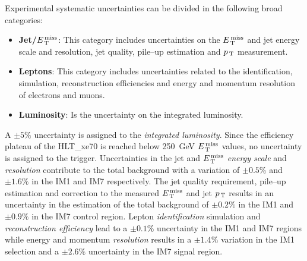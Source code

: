 Experimental systematic uncertainties can be divided in the following broad
categories:
\begin{itemize}
\item \textbf{Jet/$E_\mathrm{\, T}^\mathrm{\, miss}$}: This category includes uncertainties on the $E_\mathrm{\, T}^\mathrm{\, miss}$
  and jet energy scale and resolution, jet quality, pile--up estimation and
  $p_\mathrm{\, T}$ measurement.
\item \textbf{Leptons}: This category includes uncertainties related to the
  identification, simulation, reconstruction efficiencies and energy and
  momentum resolution of electrons and muons.
\item \textbf{Luminosity}: Is the uncertainty on the integrated luminosity.
\end{itemize}
A $\pm 5\%$ uncertainty is assigned to the \emph{integrated luminosity}. Since
the efficiency plateau of the HLT\_xe70 is reached below 250~GeV $E_\mathrm{\, T}^\mathrm{\, miss}$ values,
no uncertainty is assigned to the trigger. Uncertainties in the jet and $E_\mathrm{\, T}^\mathrm{\, miss}$
\emph{energy scale} and \emph{resolution} contribute to the total background
with a variation of $\pm 0.5\%$ and $\pm 1.6\%$ in the IM1 and IM7
respectively. The jet quality requirement, pile--up estimation and correction to
the measured $E_\mathrm{\, T}^\mathrm{\, miss}$ and jet $p_\mathrm{\, T}$ results in an uncertainty in the estimation of
the total background of $\pm 0.2\%$ in the IM1 and $\pm 0.9 \%$ in the IM7
control region. Lepton \emph{identification} simulation and
\emph{reconstruction efficiency} lead to a $\pm 0.1\%$ uncertainty in the IM1
and IM7 regions while energy and momentum \emph{resolution} results in a $\pm
1.4\%$ variation in the IM1 selection and a $\pm 2.6\%$ uncertainty in the IM7
signal region.
